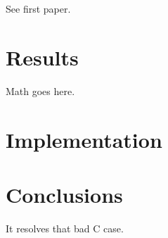See first paper.

\section{Results}

Math goes here.

\section{Implementation}

\section{Conclusions}

It resolves that bad C case.

\clearpage




\clearpage

\appendix


